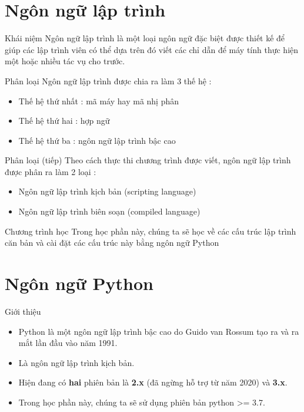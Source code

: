 \documentclass[11pt]{beamer}
\begin{document}
\section{Ngôn ngữ lập trình}
  \begin{frame}{Khái niệm}
    Ngôn ngữ lập trình là một loại ngôn ngữ đặc biệt được thiết kế để giúp các lập trình viên có thể dựa trên đó viết các chỉ dẫn để máy tính thực hiện một hoặc nhiều tác vụ cho trước.
  \end{frame}

  \begin{frame}{Phân loại}
    Ngôn ngữ lập trình được chia ra làm 3 thế hệ :
      \begin{itemize}
      \item Thế hệ thứ nhất : mã máy hay mã nhị phân
      \item Thế hệ thứ hai : hợp ngữ
      \item Thế hệ thứ ba : ngôn ngữ lập trình bậc cao
    \end{itemize}
  \end{frame}

  \begin{frame}{Phân loại (tiếp)}
    Theo cách thực thi chương trình được viết, ngôn ngữ lập trình được phân ra làm 2 loại :
      \begin{itemize}
      \item Ngôn ngữ lập trình kịch bản (scripting language)
      \item Ngôn ngữ lập trình biên soạn (compiled language)
    \end{itemize}
  \end{frame}
  
  \begin{frame}{Chương trình học}
  Trong học phần này, chúng ta sẽ học về các cấu trúc lập trình căn bản và cài đặt các cấu trúc này bằng ngôn ngữ Python
  \end{frame}

\section{Ngôn ngữ Python}
  \begin{frame}{Giới thiệu}
    \begin{itemize}
      \item Python là một ngôn ngữ lập trình bậc cao do Guido van Rossum tạo ra và ra mắt lần đầu vào năm 1991.
      \item Là ngôn ngữ lập trình kịch bản.
      \item Hiện đang có \textbf{hai} phiên bản là \textbf{2.x} (đã ngừng hỗ trợ từ năm 2020) và \textbf{3.x}.
      \item Trong học phần này, chúng ta sẽ sử dụng phiên bản python >= 3.7.
    \end{itemize}    
  \end{frame}
\end{document}
